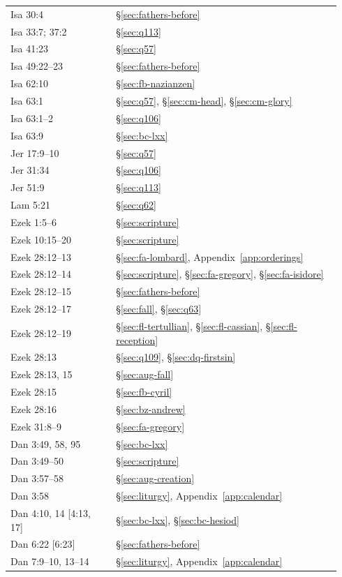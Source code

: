 \begin{longtable}{>{\raggedright\arraybackslash}p{0.30\linewidth}>{\raggedright\arraybackslash}p{0.64\linewidth}}
Isa 30:4 & \S\ref{sec:fathers-before}\\
Isa 33:7; 37:2 & \S\ref{sec:q113}\\
Isa 41:23 & \S\ref{sec:q57}\\
Isa 49:22--23 & \S\ref{sec:fathers-before}\\
Isa 62:10 & \S\ref{sec:fb-nazianzen}\\
Isa 63:1 & \S\ref{sec:q57}, \S\ref{sec:cm-head}, \S\ref{sec:cm-glory}\\
Isa 63:1--2 & \S\ref{sec:q106}\\
Isa 63:9 & \S\ref{sec:bc-lxx}\\
Jer 17:9--10 & \S\ref{sec:q57}\\
Jer 31:34 & \S\ref{sec:q106}\\
Jer 51:9 & \S\ref{sec:q113}\\
Lam 5:21 & \S\ref{sec:q62}\\
Ezek 1:5--6 & \S\ref{sec:scripture}\\
Ezek 10:15--20 & \S\ref{sec:scripture}\\
Ezek 28:12--13 & \S\ref{sec:fa-lombard}, Appendix~\ref{app:orderings}\\
Ezek 28:12--14 & \S\ref{sec:scripture}, \S\ref{sec:fa-gregory}, \S\ref{sec:fa-isidore}\\
Ezek 28:12--15 & \S\ref{sec:fathers-before}\\
Ezek 28:12--17 & \S\ref{sec:fall}, \S\ref{sec:q63}\\
Ezek 28:12--19 & \S\ref{sec:fl-tertullian}, \S\ref{sec:fl-cassian}, \S\ref{sec:fl-reception}\\
Ezek 28:13 & \S\ref{sec:q109}, \S\ref{sec:dq-firstsin}\\
Ezek 28:13, 15 & \S\ref{sec:aug-fall}\\
Ezek 28:15 & \S\ref{sec:fb-cyril}\\
Ezek 28:16 & \S\ref{sec:bz-andrew}\\
Ezek 31:8--9 & \S\ref{sec:fa-gregory}\\
Dan 3:49, 58, 95 & \S\ref{sec:bc-lxx}\\
Dan 3:49--50 & \S\ref{sec:scripture}\\
Dan 3:57--58 & \S\ref{sec:aug-creation}\\
Dan 3:58 & \S\ref{sec:liturgy}, Appendix~\ref{app:calendar}\\
Dan 4:10, 14 [4:13, 17] & \S\ref{sec:bc-lxx}, \S\ref{sec:bc-hesiod}\\
Dan 6:22 [6:23] & \S\ref{sec:fathers-before}\\
Dan 7:9--10, 13--14 & \S\ref{sec:liturgy}, Appendix~\ref{app:calendar}\\

\end{longtable}
